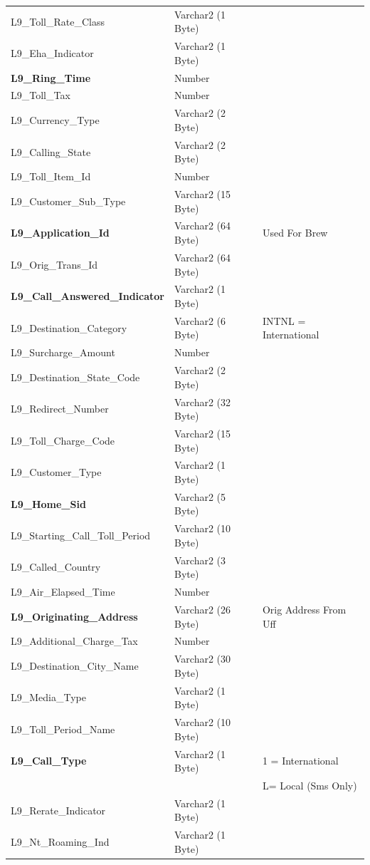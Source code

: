 \documentclass[12pt,twoside]{article}
\begin{document}
\begin{longtable}{l|l|l}
L9\_Toll\_Rate\_Class & Varchar2 (1 Byte) & \\
L9\_Eha\_Indicator & Varchar2 (1 Byte) & \\
\textbf{L9\_Ring\_Time} & Number & \\
L9\_Toll\_Tax & Number & \\
L9\_Currency\_Type & Varchar2 (2 Byte) & \\
L9\_Calling\_State & Varchar2 (2 Byte) & \\
L9\_Toll\_Item\_Id & Number & \\
L9\_Customer\_Sub\_Type & Varchar2 (15 Byte) & \\
\textbf{L9\_Application\_Id} & Varchar2 (64 Byte) & Used For Brew\\
L9\_Orig\_Trans\_Id & Varchar2 (64 Byte) & \\
\textbf{L9\_Call\_Answered\_Indicator} & Varchar2 (1 Byte) & \\
L9\_Destination\_Category & Varchar2 (6 Byte) & INTNL = International\\
L9\_Surcharge\_Amount & Number & \\
L9\_Destination\_State\_Code & Varchar2 (2 Byte) & \\
L9\_Redirect\_Number & Varchar2 (32 Byte) & \\
L9\_Toll\_Charge\_Code & Varchar2 (15 Byte) & \\
L9\_Customer\_Type & Varchar2 (1 Byte) & \\
\textbf{L9\_Home\_Sid} & Varchar2 (5 Byte) & \\
L9\_Starting\_Call\_Toll\_Period & Varchar2 (10 Byte) & \\
L9\_Called\_Country & Varchar2 (3 Byte) & \\
L9\_Air\_Elapsed\_Time & Number & \\
\textbf{L9\_Originating\_Address} & Varchar2 (26 Byte) & Orig Address From Uff\\
L9\_Additional\_Charge\_Tax & Number & \\
L9\_Destination\_City\_Name & Varchar2 (30 Byte) & \\
L9\_Media\_Type & Varchar2 (1 Byte) & \\
L9\_Toll\_Period\_Name & Varchar2 (10 Byte) & \\
\textbf{L9\_Call\_Type} & Varchar2 (1 Byte) & 1 = International\\
&  & L= Local (Sms Only)\\
L9\_Rerate\_Indicator & Varchar2 (1 Byte) & \\
L9\_Nt\_Roaming\_Ind & Varchar2 (1 Byte) & \\

\end{longtable}
\end{document}
